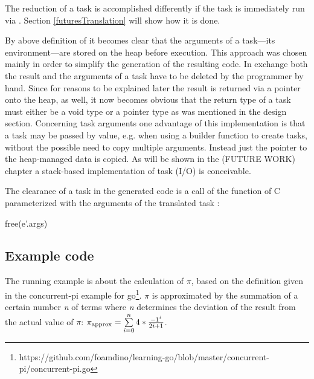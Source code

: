 The reduction of a task is accomplished differently if the task is immediately run via . Section \ref{futuresTranslation} will show how it is done.

By above definition of  it becomes clear that the arguments of a task---its environment---are stored on the heap before execution. This approach was chosen mainly in order to simplify the generation of the resulting code. In exchange both the result and the arguments of a task have to be deleted by the programmer by hand. Since for reasons to be explained later the result is returned via a pointer onto the heap, as well, it now becomes obvious that the return type of a task must either be a void type or a pointer type as was mentioned in the design section. Concerning task arguments one advantage of this implementation is that a task may be passed by value, e.g. when using a builder function to create tasks, without the possible need to copy multiple arguments. Instead just the pointer to the heap-managed data is copied. As will be shown in the (FUTURE WORK) chapter a stack-based implementation of task (I/O) is conceivable. 

The clearance of a task  in the generated code is a call of the  function of C parameterized with the arguments of the translated task :
\begin{ccode}
free(e'.args)
\end{ccode}

\subsection{Example code}
\label{taskExample}
The running example is about the calculation of $\pi$, based on the definition given in the concurrent-pi example for go\footnote{https://github.com/foamdino/learning-go/blob/master/concurrent-pi/concurrent-pi.go}. $\pi$ is approximated by the summation of a certain number \textit{n} of terms where \textit{n} determines the deviation of the result from the actual value of $\pi$: 
${\pi}_{\mathrm{approx}} = \sum\limits_{i=0}^{n}4*{-1^i \over 2i+1}$. 

